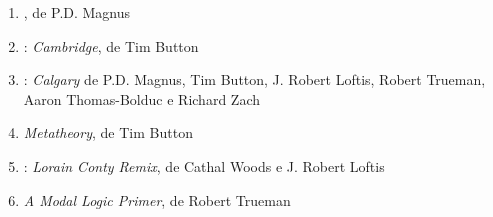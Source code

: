 \begin{enumerate}
   \item \forallx, de P.D. Magnus

   \item \forallx: \textit{Cambridge}, de Tim Button

   \item \forallx: \textit{Calgary} de P.D. Magnus, Tim Button, J. Robert Loftis, Robert Trueman, Aaron Thomas-Bolduc e Richard Zach
   
   \item \textit{Metatheory}, de Tim Button
   
   \item  \forallx: \textit{Lorain Conty Remix}, de Cathal Woods e J. Robert Loftis
   
   \item \textit{A Modal Logic Primer}, de Robert Trueman
\end{enumerate}

